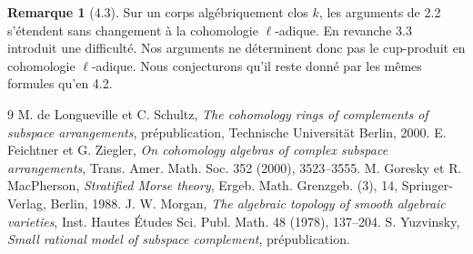 \documentclass[11pt]{article}
\theoremstyle{definition}
\newtheorem{remark}[theorem]{Remarque}
\begin{document}
\begin{remark}[4.3]
Sur un corps algébriquement clos $k$, les arguments de 2.2 s'étendent sans changement à la cohomologie $\ell$-adique. En revanche 3.3 introduit une difficulté. Nos arguments ne déterminent donc pas le cup-produit en cohomologie $\ell$-adique. Nous conjecturons qu'il reste donné par les mêmes formules qu'en 4.2.
\end{remark}

\begin{thebibliography}{9}
 M. de Longueville et C. Schultz, \emph{The cohomology rings of complements of subspace arrangements}, prépublication, Technische Universität Berlin, 2000.
 E. Feichtner et G. Ziegler, \emph{On cohomology algebras of complex subspace arrangements}, Trans. Amer. Math. Soc. 352 (2000), 3523--3555.
 M. Goresky et R. MacPherson, \emph{Stratified Morse theory}, Ergeb. Math. Grenzgeb. (3), 14, Springer-Verlag, Berlin, 1988.
 J. W. Morgan, \emph{The algebraic topology of smooth algebraic varieties}, Inst. Hautes Études Sci. Publ. Math. 48 (1978), 137--204.
 S. Yuzvinsky, \emph{Small rational model of subspace complement}, prépublication.
\end{thebibliography}
\end{document}
